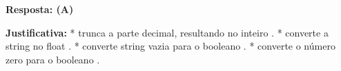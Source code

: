 \ifmostrarGabarito
\textbf{Resposta: (A)}

\textbf{Justificativa:}
*  trunca a parte decimal, resultando no inteiro .
*  converte a string no float .
*  converte string vazia para o booleano .
*  converte o número zero para o booleano .

\fi
